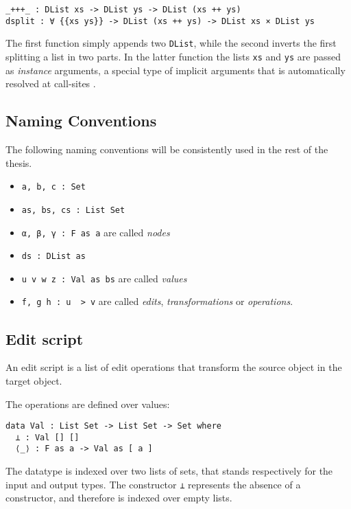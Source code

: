 \documentclass[../Thesis.tex]{subfiles}
\begin{document}
\begin{verbatim}
_+++_ : DList xs -> DList ys -> DList (xs ++ ys)
dsplit : ∀ {{xs ys}} -> DList (xs ++ ys) -> DList xs × DList ys
\end{verbatim}
	
	The first function simply appends two \texttt{DList}, while the second 
	inverts the first splitting a list in two parts.
	In the latter function the lists \texttt{xs} and \texttt{ys} are passed
	as \emph{instance} arguments, a special type of implicit arguments 
	that is automatically resolved at call-sites \cite{Devriese11}.

	\subsection{Naming Conventions}
	The following naming conventions will be consistently used in the rest of  
	the thesis. 
	\begin{itemize}
		\item \texttt{a, b, c :\ Set}
		\item \texttt{as, bs, cs :\ List Set}
		\item \texttt{α, β, γ :\ F as a} are called \emph{nodes}
		\item \texttt{ds :\ DList as} 
		\item \texttt{u v w z :\ Val as bs} are called \emph{values}
		\item \texttt{f, g h :\ u ~> v} are called  \emph{edits},
		\emph{transformations} or \emph{operations}.
	\end{itemize}
		 
	\subsection{Edit script}
	An edit script is a list of edit operations that transform the source object in
	the target object.

	The operations are defined over values:
		
\begin{verbatim}
data Val : List Set -> List Set -> Set where
  ⊥ : Val [] []
  ⟨_⟩ : F as a -> Val as [ a ] 
\end{verbatim}
	The datatype is indexed over two lists of sets, that stands respectively
	for the input and output types.
	The constructor \texttt{⊥} represents the absence of a constructor, and
	therefore is indexed over empty lists.
	
\end{document}
